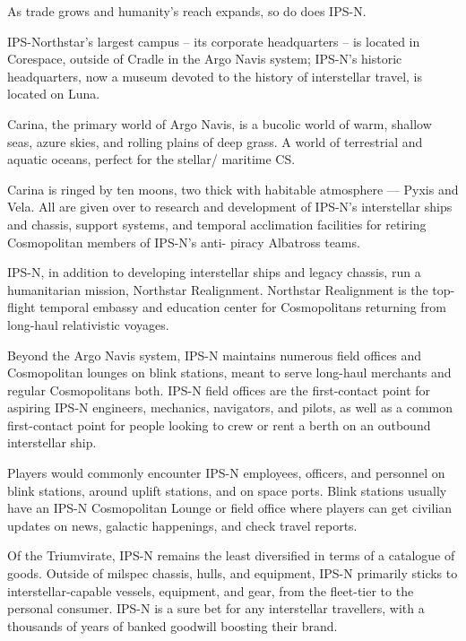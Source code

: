                                                                                                            


As trade grows and humanity’s reach expands, so do does IPS-N.    

IPS-Northstar’s largest campus -- its corporate headquarters -- is located in Corespace, outside  
of Cradle in the Argo Navis system; IPS-N’s historic headquarters, now a museum devoted to the  
history of interstellar travel, is located on Luna. 
 

Carina, the primary world of Argo Navis, is a bucolic world of warm, shallow seas, azure skies,  
and rolling plains of deep grass. A world of terrestrial and aquatic oceans, perfect for the stellar/ 
maritime CS. 
 

Carina is ringed by ten moons, two thick with habitable atmosphere — Pyxis and Vela. All are  
given over to research and development of IPS-N’s interstellar ships and chassis, support  
systems, and temporal acclimation facilities for retiring Cosmopolitan members of IPS-N’s anti- 
piracy Albatross teams. 
 

IPS-N, in addition to developing interstellar ships and legacy chassis, run a humanitarian  
mission, Northstar Realignment. Northstar Realignment is the top-flight temporal embassy and  
education center for Cosmopolitans returning from long-haul relativistic voyages. 
 

Beyond the Argo Navis system, IPS-N maintains numerous field offices and Cosmopolitan  
lounges on blink stations, meant to serve long-haul merchants and regular Cosmopolitans both.  
IPS-N field offices are the first-contact point for aspiring IPS-N engineers, mechanics,  
navigators, and pilots, as well as a common first-contact point for people looking to crew or rent  
a berth on an outbound interstellar ship. 
 

Players would commonly encounter IPS-N employees, officers, and personnel on blink stations,  
around uplift stations, and on space ports. Blink stations usually have an IPS-N Cosmopolitan  
Lounge or field office where players can get civilian updates on news, galactic happenings, and  
check travel reports. 
 

Of the Triumvirate, IPS-N remains the least diversified in terms of a catalogue of goods. Outside  
of milspec chassis, hulls, and equipment, IPS-N primarily sticks to interstellar-capable vessels,  
equipment, and gear, from the fleet-tier to the personal consumer. IPS-N is a sure bet for any  
interstellar travellers, with a thousands of years of banked goodwill boosting their brand. 
 
